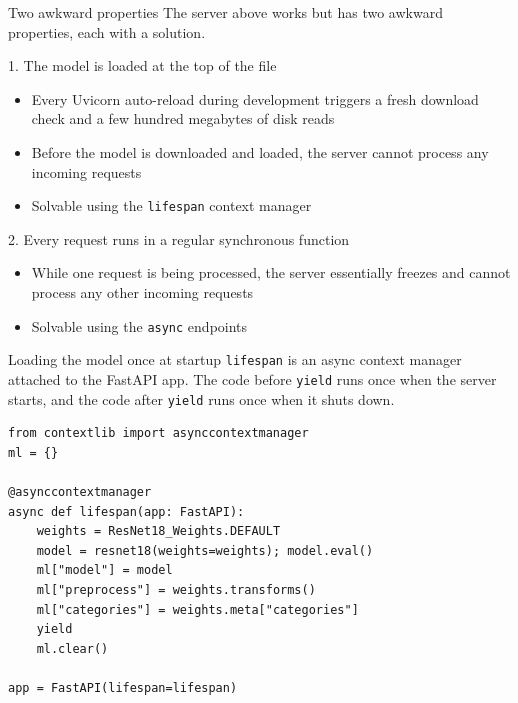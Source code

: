 \documentclass[aspectratio=169]{beamer}
\begin{document}
\begin{frame}{Two awkward properties}
    The server above works but has two awkward properties, each with a solution.

    \begin{block}{1. The model is loaded at the top of the file}
\begin{itemize}
\item Every Uvicorn auto-reload during development triggers a fresh download check and a few hundred megabytes of disk reads
\item Before the model is downloaded and loaded, the server cannot process any incoming requests
\item Solvable using the \texttt{lifespan} context manager
\end{itemize}
    \end{block}

    \begin{block}{2. Every request runs in a regular synchronous function}
\begin{itemize}
\item While one request is being processed, the server essentially freezes and cannot process any other incoming requests
\item Solvable using the \texttt{async} endpoints
\end{itemize}
    \end{block}
\end{frame}

\begin{frame}[fragile]{Loading the model once at startup}
    \texttt{lifespan} is an async context manager attached to the FastAPI app.
    The code before \texttt{yield} runs once when the server starts, and the code after \texttt{yield} runs once when it shuts down.

    \begin{verbatim}
from contextlib import asynccontextmanager
ml = {}

@asynccontextmanager
async def lifespan(app: FastAPI):
    weights = ResNet18_Weights.DEFAULT
    model = resnet18(weights=weights); model.eval()
    ml["model"] = model
    ml["preprocess"] = weights.transforms()
    ml["categories"] = weights.meta["categories"]
    yield
    ml.clear()

app = FastAPI(lifespan=lifespan)
    \end{verbatim}
\end{frame}
\end{document}

